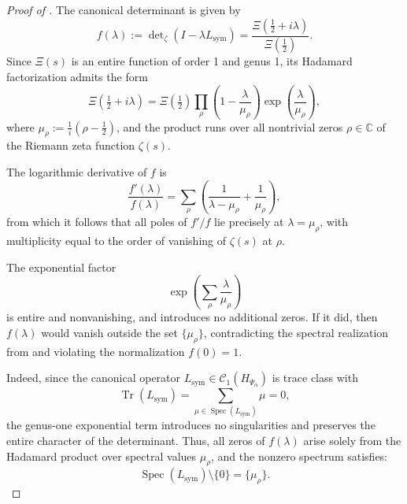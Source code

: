 \begin{proof}[Proof of ]
The canonical determinant is given by
\[
f(\lambda) := \det\nolimits_\zeta(I - \lambda L_{\mathrm{sym}}) = \frac{\Xi\left(\tfrac{1}{2} + i\lambda\right)}{\Xi\left(\tfrac{1}{2}\right)}.
\]
Since \( \Xi(s) \) is an entire function of order 1 and genus 1, its Hadamard factorization admits the form
\[
\Xi\left(\tfrac{1}{2} + i\lambda\right)
= \Xi\left(\tfrac{1}{2}\right) \prod_{\rho} \left(1 - \frac{\lambda}{\mu_\rho} \right)
\exp\left( \frac{\lambda}{\mu_\rho} \right),
\]
where \( \mu_\rho := \frac{1}{i}(\rho - \tfrac{1}{2}) \), and the product runs over all nontrivial zeros \( \rho \in \mathbb{C} \) of the Riemann zeta function \( \zeta(s) \).

\medskip
\noindent
The logarithmic derivative of \( f \) is
\[
\frac{f'(\lambda)}{f(\lambda)} = \sum_\rho \left( \frac{1}{\lambda - \mu_\rho} + \frac{1}{\mu_\rho} \right),
\]
from which it follows that all poles of \( f'/f \) lie precisely at \( \lambda = \mu_\rho \), with multiplicity equal to the order of vanishing of \( \zeta(s) \) at \( \rho \).

\medskip
\noindent
The exponential factor
\[
\exp\left( \sum_\rho \frac{\lambda}{\mu_\rho} \right)
\]
is entire and nonvanishing, and introduces no additional zeros. If it did, then \( f(\lambda) \) would vanish outside the set \( \{ \mu_\rho \} \), contradicting the spectral realization from  and violating the normalization \( f(0) = 1 \).

\medskip
\noindent
Indeed, since the canonical operator \( L_{\mathrm{sym}} \in \mathcal{C}_1(H_{\Psi_\alpha}) \) is trace class with
\[
\operatorname{Tr}(L_{\mathrm{sym}}) = \sum_{\mu \in \operatorname{Spec}(L_{\mathrm{sym}})} \mu = 0,
\]
the genus-one exponential term introduces no singularities and preserves the entire character of the determinant. Thus, all zeros of \( f(\lambda) \) arise solely from the Hadamard product over spectral values \( \mu_\rho \), and the nonzero spectrum satisfies:
\[
\operatorname{Spec}(L_{\mathrm{sym}}) \setminus \{0\} = \{ \mu_\rho \}.
\]
\end{proof}
